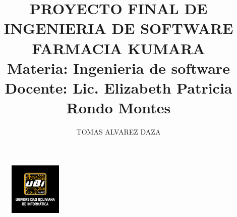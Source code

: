 \documentclass[12pt,letterpaper]{report}
\author{TOMAS ALVAREZ DAZA}
\begin{document}
\begin{titlepage}
	\begin{figure}
		\includegraphics[width=2.5cm]{image/logoUbi2}
	\end{figure}
	\title{PROYECTO FINAL DE INGENIERIA DE SOFTWARE\\
	\textbf{FARMACIA KUMARA}\\
	\textbf{Materia:} Ingenieria de software\\ 
	\textbf{Docente:}  Lic. Elizabeth Patricia Rondo Montes
 }
	
\end{titlepage}
\maketitle
\tableofcontents





\end{document}
